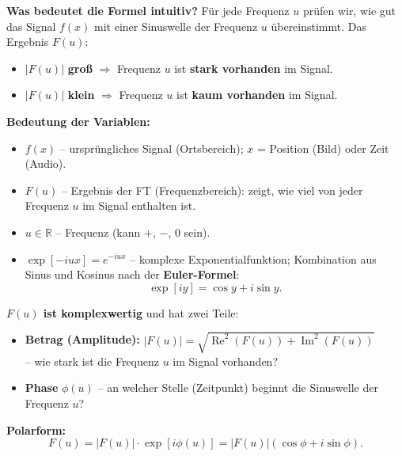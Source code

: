 \documentclass[12pt, a4paper]{article}
\begin{document}
\textbf{Was bedeutet die Formel intuitiv?} Für jede Frequenz $u$ prüfen
wir, wie gut das Signal $f(x)$ mit einer Sinuswelle der Frequenz $u$
\glqq{}übereinstimmt\grqq{}. Das Ergebnis $F(u)$:
\begin{itemize}
  \item $|F(u)|$ \textbf{groß} $\Rightarrow$ Frequenz $u$ ist
        \textbf{stark vorhanden} im Signal.
  \item $|F(u)|$ \textbf{klein} $\Rightarrow$ Frequenz $u$ ist
        \textbf{kaum vorhanden} im Signal.
\end{itemize}

\textbf{Bedeutung der Variablen:}
\begin{itemize}
  \item $f(x)$ -- ursprüngliches Signal (Ortsbereich); $x$ = Position
        (Bild) oder Zeit (Audio).
  \item $F(u)$ -- Ergebnis der FT (Frequenzbereich): zeigt, wie viel
        von jeder Frequenz $u$ im Signal enthalten ist.
  \item $u \in \mathbb{R}$ -- Frequenz (kann $+$, $-$, $0$ sein).
  \item $\exp[-iux] = e^{-iux}$ -- komplexe Exponentialfunktion;
        Kombination aus Sinus und Kosinus nach der
        \textbf{Euler-Formel}:
        \[ \exp[iy] = \cos y + i\sin y. \]
\end{itemize}

\textbf{$F(u)$ ist komplexwertig} und hat zwei Teile:
\begin{itemize}
  \item \textbf{Betrag (Amplitude):}
        $|F(u)| = \sqrt{\operatorname{Re}^2(F(u)) +
        \operatorname{Im}^2(F(u))}$ \\ -- wie stark ist die
        Frequenz $u$ im Signal vorhanden?
  \item \textbf{Phase} $\phi(u)$ -- an welcher Stelle (Zeitpunkt)
        beginnt die Sinuswelle der Frequenz $u$?
\end{itemize}

\textbf{Polarform:}
\[
  F(u) = |F(u)| \cdot \exp[i\phi(u)]
       = |F(u)|(\cos\phi + i\sin\phi).
\]
\end{document}
